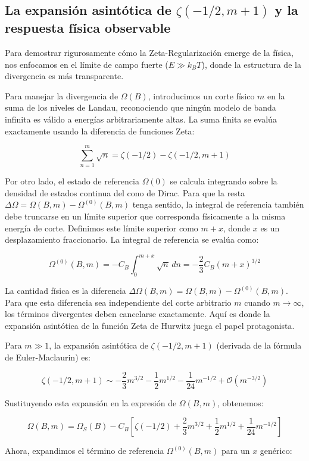 \subsection{La expansión asintótica de $\zeta(-1/2, m+1)$ y la respuesta física observable}

Para demostrar rigurosamente cómo la Zeta-Regularización emerge de la física, nos enfocamos en el límite de campo fuerte ($E \gg k_B T$), donde la estructura de la divergencia es más transparente. 

Para manejar la divergencia de $\Omega(B)$, introducimos un corte físico $m$ en la suma de los niveles de Landau, reconociendo que ningún modelo de banda infinita es válido a energías arbitrariamente altas. La suma finita se evalúa exactamente usando la diferencia de funciones Zeta:

$$ \sum_{n=1}^{m} \sqrt{n} = \zeta(-1/2) - \zeta(-1/2, m+1) $$

Por otro lado, el estado de referencia $\Omega(0)$ se calcula integrando sobre la densidad de estados continua del cono de Dirac. Para que la resta $\Delta\Omega = \Omega(B, m) - \Omega^{(0)}(B, m)$ tenga sentido, la integral de referencia también debe truncarse en un límite superior que corresponda físicamente a la misma energía de corte. Definimos este límite superior como $m+x$, donde $x$ es un desplazamiento fraccionario. La integral de referencia se evalúa como:

$$ \Omega^{(0)}(B, m) = -C_B \int_{0}^{m+x} \sqrt{n} \, dn = -\frac{2}{3} C_B (m+x)^{3/2} $$

La cantidad física es la diferencia $\Delta\Omega(B, m) = \Omega(B, m) - \Omega^{(0)}(B, m)$. Para que esta diferencia sea independiente del corte arbitrario $m$ cuando $m \to \infty$, los términos divergentes deben cancelarse exactamente. Aquí es donde la expansión asintótica de la función Zeta de Hurwitz juega el papel protagonista.

Para $m \gg 1$, la expansión asintótica de $\zeta(-1/2, m+1)$ (derivada de la fórmula de Euler-Maclaurin) es:

$$ \zeta(-1/2, m+1) \sim -\frac{2}{3}m^{3/2} - \frac{1}{2}m^{1/2} - \frac{1}{24}m^{-1/2} + \mathcal{O}(m^{-3/2}) $$

Sustituyendo esta expansión en la expresión de $\Omega(B, m)$, obtenemos:

$$ \Omega(B, m) = \Omega_S(B) - C_B \left[ \zeta(-1/2) + \frac{2}{3}m^{3/2} + \frac{1}{2}m^{1/2} + \frac{1}{24}m^{-1/2} \right] $$

Ahora, expandimos el término de referencia $\Omega^{(0)}(B, m)$ para un $x$ genérico:

